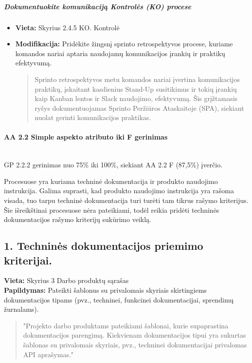 \documentclass{article}
\newcommand{\subsubsubsection}[1]{\paragraph{#1}\mbox{}\\}
\begin{document}
\subparagraph{Dokumentuokite komunikaciją Kontrolės (KO) procese}
\begin{itemize}
    \item \textbf{Vieta:} Skyrius 2.4.5 KO. Kontrolė
    \item \textbf{Modifikacija:} Pridėkite žingsnį sprinto retrospektyvos procese, kuriame komandos nariai aptaria naudojamų komunikacijos įrankių ir praktikų efektyvumą.
    \begin{quote}
        Sprinto retrospektyvos metu komandos nariai įvertina komunikacijos praktikų, įskaitant kasdienius Stand-Up susitikimus ir tokių įrankių kaip Kanban lentos ir Slack naudojimo, efektyvumą. Šis grįžtamasis ryšys dokumentuojamas Sprinto Peržiūros Ataskaitoje (SPA), siekiant nuolat gerinti komunikacijos praktikas.
    \end{quote}
\end{itemize}


\subsubsubsection{AA 2.2 Simple aspekto atributo iki F gerinimas}

GP 2.2.2 gerinimas nuo 75\% iki 100\%, siekiant AA 2.2 F (87,5\%) įverčio.

\color{red}Procesuose yra kuriama techninė dokumentacija ir produkto naudojimo instrukcija. Galima suprasti, kad produkto naudojimo instrukcija yra rašoma visada, tuo tarpu techninė dokumentacija turi turėti tam tikrus rašymo kriterijus. Šie išreikštinai procesuose nėra pateikiami, todėl reikia pridėti techninės dokumentacijos rašymo kriterijų sukūrimo veiklą. 

\subsection*{1. Techninės dokumentacijos priemimo kriterijai.}
\textbf{Vieta:} Skyrius 3 Darbo produktų sąrašas \\
\textbf{Papildymas:} Pateikti šablonus su privalomais skyriais skirtingiems dokumentacijos tipams (pvz., techninei, funkcinei dokumentacijai, sprendimų žurnalams).
\begin{quote}
"Projekto darbo produktams pateikiami šablonai, kurie supaprastina dokumentacijos parengimą. Kiekvienam dokumentacijos tipui yra sukurtas šablonas su privalomais skyriais, pvz., techninei dokumentacijai privalomas API aprašymas."
\end{quote}
\color{black}
\end{document}
